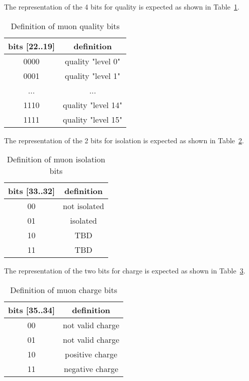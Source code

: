 The representation of the 4 bits for quality is expected as shown in Table~\ref{tab:gtl:muon_quality_bits}.\\

\begin{table}[ht]
\caption{Definition of muon quality bits}
\vspace{5mm}
\centering
\begin{tabular}{|c|c|}\hline
bits [22..19] & definition \\\hline\hline
0000 & quality "level 0" \\
0001 & quality "level 1" \\
... & ... \\
1110 & quality "level 14" \\
1111 & quality "level 15" \\\hline
\end{tabular}
\label{tab:gtl:muon_quality_bits}
\end{table}

The representation of the 2 bits for isolation is expected as shown in Table~\ref{tab:gtl:muon_iso_bits}.\\

\begin{table}[ht]
\caption{Definition of muon isolation bits}
\vspace{5mm}
\centering
\begin{tabular}{|c|c|}\hline
bits [33..32] & definition \\\hline\hline
00 & not isolated \\
01 & isolated \\
10 & TBD \\
11 & TBD \\\hline
\end{tabular}
\label{tab:gtl:muon_iso_bits}
\end{table}

The representation of the two bits for charge is expected as shown in Table~\ref{tab:gtl:muon_charge_bits}.\\

\begin{table}[ht]
\caption{Definition of muon charge bits}
\vspace{5mm}
\centering
\begin{tabular}{|c|c|}\hline
bits [35..34] & definition \\\hline\hline
00 & not valid charge \\
01 & not valid charge \\
10 & positive charge \\
11 & negative charge \\\hline
\end{tabular}
\label{tab:gtl:muon_charge_bits}
\end{table}

